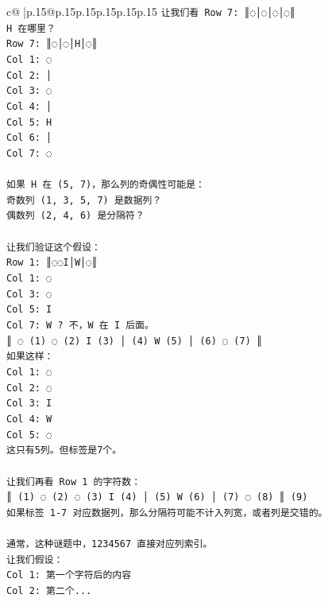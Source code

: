 \documentclass{article}
\begin{document}
{\begin{supertabular}{c@{$\;$}|p{.15\linewidth}@{}p{.15\linewidth}p{.15\linewidth}p{.15\linewidth}p{.15\linewidth}p{.15\linewidth}}
{{{\texttt{让我们看 Row 7: ║◌│◌│◌│◌║} \\
\texttt{H 在哪里？} \\
\texttt{Row 7: ║◌│◌│H│◌║} \\
\texttt{Col 1: ◌} \\
\texttt{Col 2: │} \\
\texttt{Col 3: ◌} \\
\texttt{Col 4: │} \\
\texttt{Col 5: H} \\
\texttt{Col 6: │} \\
\texttt{Col 7: ◌} \\
\\ 
\texttt{如果 H 在 (5, 7)，那么列的奇偶性可能是：} \\
\texttt{奇数列 (1, 3, 5, 7) 是数据列？} \\
\texttt{偶数列 (2, 4, 6) 是分隔符？} \\
\\ 
\texttt{让我们验证这个假设：} \\
\texttt{Row 1: ║◌◌I│W│◌║} \\
\texttt{Col 1: ◌} \\
\texttt{Col 3: ◌} \\
\texttt{Col 5: I} \\
\texttt{Col 7: W ? 不，W 在 I 后面。} \\
\texttt{║ ◌ (1) ◌ (2) I (3) │ (4) W (5) │ (6) ◌ (7) ║} \\
\texttt{如果这样：} \\
\texttt{Col 1: ◌} \\
\texttt{Col 2: ◌} \\
\texttt{Col 3: I} \\
\texttt{Col 4: W} \\
\texttt{Col 5: ◌} \\
\texttt{这只有5列。但标签是7个。} \\
\\ 
\texttt{让我们再看 Row 1 的字符数：} \\
\texttt{║ (1) ◌ (2) ◌ (3) I (4) │ (5) W (6) │ (7) ◌ (8) ║ (9)} \\
\texttt{如果标签 1{-}7 对应数据列，那么分隔符可能不计入列宽，或者列是交错的。} \\
\\ 
\texttt{通常，这种谜题中，1234567 直接对应列索引。} \\
\texttt{让我们假设：} \\
\texttt{Col 1: 第一个字符后的内容} \\
\texttt{Col 2: 第二个...} \\
}}}
\end{supertabular}}
\end{document}
